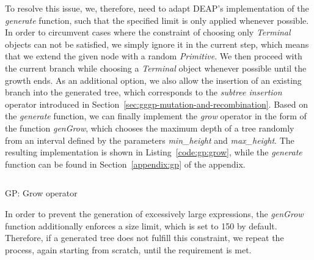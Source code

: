 To resolve this issue, we, therefore, need to adapt DEAP's implementation of the \emph{generate} function, such that the specified limit is only applied whenever possible.
In order to circumvent cases where the constraint of choosing only \emph{Terminal} objects can not be satisfied, we simply ignore it in the current step, which means that we extend the given node with a random \emph{Primitive}.
We then proceed with the current branch while choosing a \emph{Terminal} object whenever possible until the growth ends.
As an additional option, we also allow the insertion of an existing branch into the generated tree, which corresponds to the \emph{subtree insertion} operator introduced in Section~\ref{sec:gggp-mutation-and-recombination}.
Based on the \emph{generate} function, we can finally implement the \emph{grow} operator in the form of the function \emph{genGrow}, which chooses the maximum depth of a tree randomly from an interval defined by the parameters \emph{min\_height} and \emph{max\_height}.
The resulting implementation is shown in Listing~\ref{code:gp:grow}, while the \emph{generate} function can be found in Section~\ref{appendix:gp} of the appendix.
\begin{listing}
	\inputminted{python}{evostencils/gp/grow.py}
	\caption{GP: Grow operator}
	\label{code:gp:grow}
\end{listing}
In order to prevent the generation of excessively large expressions, the \emph{genGrow} function additionally enforces a size limit, which is set to 150 by default.
Therefore, if a generated tree does not fulfill this constraint, we repeat the process, again starting from scratch, until the requirement is met.


